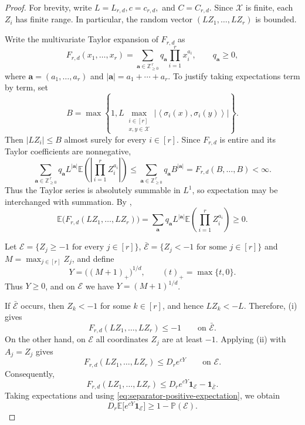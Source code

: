 \documentclass[twoside,12pt]{article}
\theoremstyle{definition}
\theoremstyle{remark}
\newcommand{\E}{\mathbb E}
\newcommand{\Pp}{\mathbb P}
\newcommand{\1}{\mathbf 1}
\newcommand{\ip}[2]{\left\langle #1,#2\right\rangle}
\begin{document}
\begin{proof}
For brevity, write
$
 L=L_{r,d},
 c=c_{r,d},$ and $
 C=C_{r,d}.
$
Since $\mathcal X$ is finite, each $Z_i$ has finite range. In particular,
the random vector $(LZ_1,\ldots,LZ_r)$ is bounded.

Write the multivariate Taylor expansion of $F_{r,d}$ as
\[
 F_{r,d}(x_1,\ldots,x_r)
 =\sum_{\mathbf a\in\mathbb Z_{\ge0}^{\,r}}
 q_{\mathbf a}\prod_{i=1}^r x_i^{a_i},
 \qquad q_{\mathbf a}\ge0,
\]
where $\mathbf a=(a_1,\ldots,a_r)$ and
$|\mathbf a|=a_1+\cdots+a_r$. To justify taking expectations term by term,
set
\[
 B=\max\left\{
 1,
 L\max_{\substack{i\in[r]\\x,y\in\mathcal X}}
 \left|\ip{\sigma_i(x)}{\sigma_i(y)}\right|
 \right\}.
\]
Then $|LZ_i|\le B$ almost surely for every $i\in[r]$. Since $F_{r,d}$ is
entire and its Taylor coefficients are nonnegative,
\[
 \sum_{\mathbf a\in\mathbb Z_{\ge0}^{\,r}}
 q_{\mathbf a}L^{|\mathbf a|}
 \E\left(\left|\prod_{i=1}^rZ_i^{a_i}\right|\right)
 \le
 \sum_{\mathbf a\in\mathbb Z_{\ge0}^{\,r}}
 q_{\mathbf a}B^{|\mathbf a|}
 =F_{r,d}(B,\ldots,B)<\infty.
\]
Thus the Taylor series is absolutely summable in $L^1$, so expectation may
be interchanged with summation. By ,
\begin{equation}\label{eq:separator-positive-expectation}
 \E\bigl(F_{r,d}(LZ_1,\ldots,LZ_r)\bigr)
 =\sum_{\mathbf a}q_{\mathbf a}L^{|\mathbf a|}
 \E\left(\prod_{i=1}^rZ_i^{a_i}\right)
 \ge0.
\end{equation}

Let
$\mathcal E=\{Z_j\ge-1\text{ for every }j\in[r]\}$, $\bar{\mathcal E}=\{Z_j<-1\text{ for some }j\in[r]\}$
and
 $M=\max_{j\in[r]}Z_j$,
and define
\[
 Y=\bigl((M+1)_+\bigr)^{1/d},
 \qquad
 (t)_+=\max\{t,0\}.
\]
Thus $Y\ge0$, and on $\mathcal E$ we have $Y=(M+1)^{1/d}$.

If $\bar{\mathcal E}$ occurs, then $Z_k<-1$ for some $k\in[r]$, and hence
$LZ_k<-L$. Therefore, (i) gives
\[
 F_{r,d}(LZ_1,\ldots,LZ_r)\le-1
 \qquad\text{on }\bar{\mathcal E}.
\]
On the other hand, on $\mathcal E$ all coordinates $Z_j$ are at least
$-1$. Applying (ii) with $A_j=Z_j$ gives
\[
 F_{r,d}(LZ_1,\ldots,LZ_r)\le D_re^{cY}
 \qquad\text{on }\mathcal E.
\]
Consequently,
\[
 F_{r,d}(LZ_1,\ldots,LZ_r)
 \le D_re^{cY}\1_{\mathcal E}-\1_{\bar{\mathcal E}}.
\]
Taking expectations and using
\eqref{eq:separator-positive-expectation}, we obtain
\begin{equation}\label{eq:correlation-master}
 D_r\E\bigl[e^{cY}\1_{\mathcal E}\bigr]
 \ge1-\Pp(\mathcal E).
\end{equation}


\end{proof}
\end{document}
